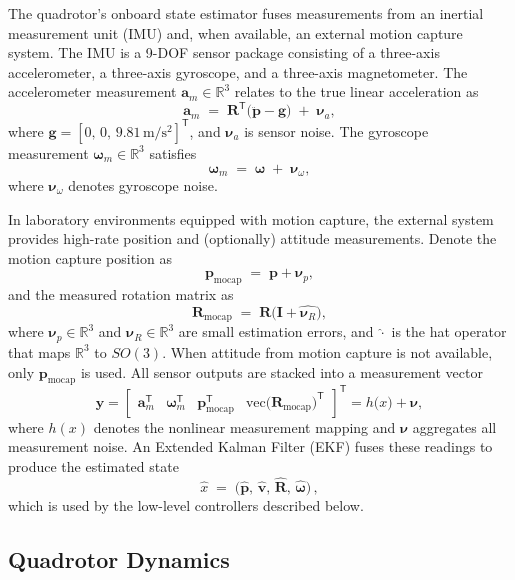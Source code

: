 The quadrotor's onboard state estimator fuses measurements from an inertial measurement unit (IMU) and, when available, an external motion capture system. The IMU is a 9-DOF sensor package consisting of a three-axis accelerometer, a three-axis gyroscope, and a three-axis magnetometer. The accelerometer measurement \(\mathbf{a}_{m}\in \mathbb{R}^{3}\) relates to the true linear acceleration as
\[
\mathbf{a}_{m} \;=\; \mathbf{R}^{\mathsf{T}}\bigl(\ddot{\mathbf{p}} - \mathbf{g}\bigr) \;+\; \boldsymbol{\nu}_{a},
\]
where \(\mathbf{g} = [0,\,0,\,9.81\,\mathrm{m/s^{2}}]^{\mathsf{T}}\), and \(\boldsymbol{\nu}_{a}\) is sensor noise. The gyroscope measurement \(\boldsymbol{\omega}_{m}\in \mathbb{R}^{3}\) satisfies
\[
\boldsymbol{\omega}_{m} \;=\; \boldsymbol{\omega} \;+\; \boldsymbol{\nu}_{\omega},
\]
where \(\boldsymbol{\nu}_{\omega}\) denotes gyroscope noise. 

In laboratory environments equipped with motion capture, the external system provides high-rate position and (optionally) attitude measurements. Denote the motion capture position as
\[
\mathbf{p}_{\mathrm{mocap}} \;=\; \mathbf{p} + \boldsymbol{\nu}_{p}, 
\]
and the measured rotation matrix as
\[
\mathbf{R}_{\mathrm{mocap}} \;=\; \mathbf{R} \bigl(\mathbf{I} + \widehat{\boldsymbol{\nu}_{R}}\bigr),
\]
where \(\boldsymbol{\nu}_{p}\in \mathbb{R}^{3}\) and \(\boldsymbol{\nu}_{R}\in \mathbb{R}^{3}\) are small estimation errors, and \(\widehat{\cdot}\) is the hat operator that maps \(\mathbb{R}^{3}\) to \(SO(3)\). When attitude from motion capture is not available, only \(\mathbf{p}_{\mathrm{mocap}}\) is used. All sensor outputs are stacked into a measurement vector
\[
\mathbf{y} 
= \begin{bmatrix}
\mathbf{a}_{m}^{\mathsf{T}} & \boldsymbol{\omega}_{m}^{\mathsf{T}} & \mathbf{p}_{\mathrm{mocap}}^{\mathsf{T}} & \mathrm{vec}\bigl(\mathbf{R}_{\mathrm{mocap}}\bigr)^{\mathsf{T}}
\end{bmatrix}^{\mathsf{T}} 
= h\bigl(x\bigr) + \boldsymbol{\nu},
\]
where \(h(x)\) denotes the nonlinear measurement mapping and \(\boldsymbol{\nu}\) aggregates all measurement noise. An Extended Kalman Filter (EKF) fuses these readings to produce the estimated state 
\[
\hat x \;=\; \bigl(\hat{\mathbf{p}},\,\hat{\mathbf{v}},\,\hat{\mathbf{R}},\,\hat{\boldsymbol{\omega}}\bigr)\,,
\]
which is used by the low-level controllers described below.

\subsection{Quadrotor Dynamics}
\label{sec:quadrotor_dynamics}

